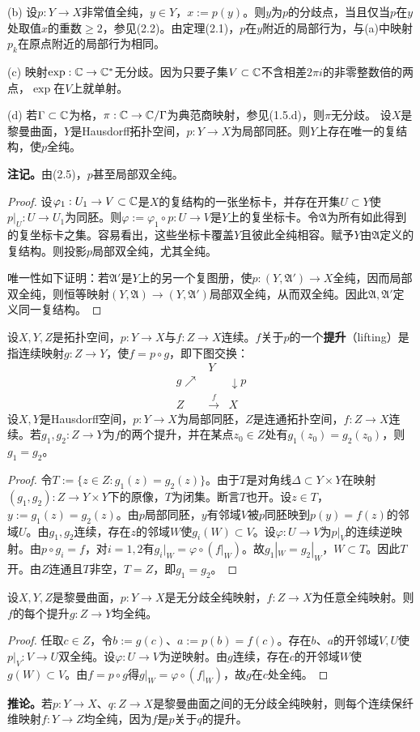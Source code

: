 (b) 设$p:Y\to X$非常值全纯，$y\in Y$，$x:=p(y)$。则$y$为$p$的分歧点，当且仅当$p$在$y$处取值$x$的重数$\ge2$，参见(2.2)。由定理(2.1)，$p$在$y$附近的局部行为，与(a)中映射$p_k$在原点附近的局部行为相同。

(c) 映射$\exp:\mathbb C\to\mathbb C^*$无分歧。因为只要子集$V\subset\mathbb C$不含相差$2\pi i$的非零整数倍的两点，$\exp$在$V$上就单射。

(d) 若$\Gamma\subset\mathbb C$为格，$\pi:\mathbb C\to\mathbb C/\Gamma$为典范商映射，参见(1.5.d)，则$\pi$无分歧。
设$X$是黎曼曲面，$Y$是Hausdorff拓扑空间，$p:Y\to X$为局部同胚。则$Y$上存在唯一的复结构，使$p$全纯。

\textbf{注记。}由(2.5)，$p$甚至局部双全纯。
\begin{proof}
设$\varphi_1:U_1\to V\subset\mathbb C$是$X$的复结构的一张坐标卡，并存在开集$U\subset Y$使$p|_U:U\to U_1$为同胚。则$\varphi:=\varphi_1\circ p:U\to V$是$Y$上的复坐标卡。令$\mathfrak A$为所有如此得到的复坐标卡之集。容易看出，这些坐标卡覆盖$Y$且彼此全纯相容。赋予$Y$由$\mathfrak A$定义的复结构。则投影$p$局部双全纯，尤其全纯。

唯一性如下证明：若$\mathfrak A'$是$Y$上的另一个复图册，使$p:(Y,\mathfrak A')\to X$全纯，因而局部双全纯，则恒等映射$(Y,\mathfrak A)\to(Y,\mathfrak A')$局部双全纯，从而双全纯。因此$\mathfrak A,\mathfrak A'$定义同一复结构。
\end{proof}
设$X,Y,Z$是拓扑空间，$p:Y\to X$与$f:Z\to X$连续。$f$关于$p$的一个\textbf{提升}（lifting）是指连续映射$g:Z\to Y$，使$f=p\circ g$，即下图交换：
\[
\begin{array}{ccc} &Y&\\ {\scriptstyle g}\nearrow&&\downarrow{\scriptstyle p}\\ Z&\xrightarrow{f}&X\end{array}
\]
设$X,Y$是Hausdorff空间，$p:Y\to X$为局部同胚，$Z$是连通拓扑空间，$f:Z\to X$连续。若$g_1,g_2:Z\to Y$为$f$的两个提升，并在某点$z_0\in Z$处有$g_1(z_0)=g_2(z_0)$，则$g_1=g_2$。
\begin{proof}
令$T:=\{z\in Z:g_1(z)=g_2(z)\}$。由于$T$是对角线$\Delta\subset Y\times Y$在映射$(g_1,g_2):Z\to Y\times Y$下的原像，$T$为闭集。断言$T$也开。设$z\in T$，$y:=g_1(z)=g_2(z)$。由$p$局部同胚，$y$有邻域$V$被$p$同胚映到$p(y)=f(z)$的邻域$U$。由$g_1,g_2$连续，存在$z$的邻域$W$使$g_i(W)\subset V$。设$\varphi:U\to V$为$p|_V$的连续逆映射。由$p\circ g_i=f$，对$i=1,2$有$g_i|_W=\varphi\circ(f|_W)$。故$g_1|_W=g_2|_W$，$W\subset T$。因此$T$开。由$Z$连通且$T$非空，$T=Z$，即$g_1=g_2$。
\end{proof}
设$X,Y,Z$是黎曼曲面，$p:Y\to X$是无分歧全纯映射，$f:Z\to X$为任意全纯映射。则$f$的每个提升$g:Z\to Y$均全纯。
\begin{proof}
任取$c\in Z$，令$b:=g(c)$、$a:=p(b)=f(c)$。存在$b$、$a$的开邻域$V,U$使$p|_V:V\to U$双全纯。设$\varphi:U\to V$为逆映射。由$g$连续，存在$c$的开邻域$W$使$g(W)\subset V$。由$f=p\circ g$得$g|_W=\varphi\circ(f|_W)$，故$g$在$c$处全纯。
\end{proof}
\textbf{推论。}若$p:Y\to X$、$q:Z\to X$是黎曼曲面之间的无分歧全纯映射，则每个连续保纤维映射$f:Y\to Z$均全纯，因为$f$是$p$关于$q$的提升。

